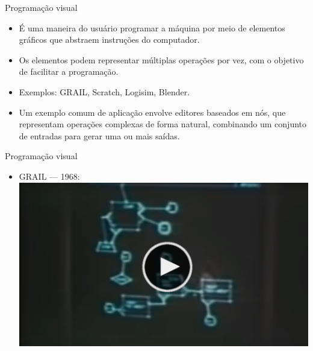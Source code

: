 \begin{frame}{Programação visual}
    \begin{itemize}
        \item É uma maneira do usuário programar a máquina por meio de elementos gráficos que abstraem instruções do computador.
        \item Os elementos podem representar múltiplas operações por vez, com o objetivo de facilitar a programação.
        \item Exemplos: GRAIL, Scratch, Logisim, Blender. 
        \item Um exemplo comum de aplicação envolve editores baseados em nós, que representam operações complexas de forma natural, combinando um conjunto de entradas para gerar uma ou mais saídas.
    \end{itemize}
\end{frame}

\begin{frame}{Programação visual} 
    \begin{itemize}
        \item GRAIL — 1968:
        \href{https://www.youtube.com/watch?v=QQhVQ1UG6aM}{
            \includegraphics[width=\textwidth, height=\textheight, keepaspectratio=true]{beamerthemesrc/images/video-thumb.png}
        }
    \end{itemize}     
\end{frame}

